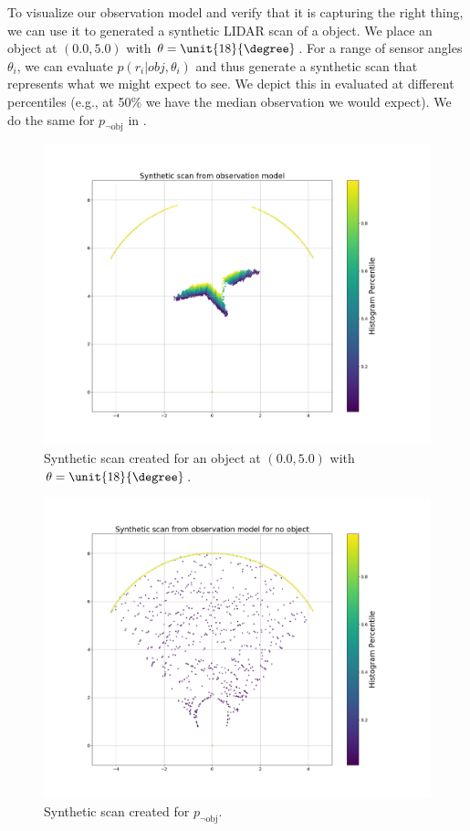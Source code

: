 To visualize our observation model and verify that it is capturing the right
thing, we can use it to generated a synthetic LIDAR scan of a object. We place
an object at $(0.0, 5.0)$ with $\theta = \unit{18}{\degree}$. For a range of
sensor angles $\theta_i$, we can evaluate $p( r_i | obj, \theta_i ) $ and thus
generate a synthetic scan that represents what we might expect to see. We depict
this in  evaluated at different percentiles (e.g., at
50\% we have the median observation we would expect). We do the same for
$p_{\lnot \text{obj}}$ in .
%
\begin{figure}
  \centering
  \includegraphics[width=\columnwidth]{figures/synthetic_scan.png}
  \caption{Synthetic scan created for an object at $(0.0, 5.0)$ with $\theta =
    \unit{18}{\degree}$.}
  \label{fig:synthetic_scan}
\end{figure}
%
\begin{figure}
  \centering
  \includegraphics[width=\columnwidth]{figures/synthetic_scan_noobj.png}
  \caption{Synthetic scan created for $p_{\lnot \text{obj}}$.}
  \label{fig:synthetic_scan_nobj}
\end{figure}
